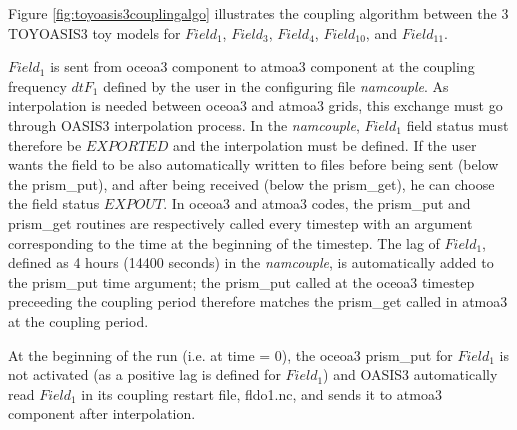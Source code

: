 Figure \ref{fig:toyoasis3couplingalgo} illustrates the coupling
algorithm between the 3 TOYOASIS3 toy models for $Field_1$, $Field_3$,
$Field_4$, $Field_{10}$, and $Field_{11}$.

$Field_1$ is sent from oceoa3 component to atmoa3 component at the
coupling frequency $dtF_1$ defined by the user in the configuring file
{\it namcouple}. As interpolation is
needed between oceoa3 and atmoa3 grids, this exchange must go through
OASIS3 interpolation process. In the {\it namcouple}, $Field_1$ field status
must therefore be $EXPORTED$ and the interpolation must be defined. If
the user wants the field to be also automatically written to files
before being sent (below the prism\_put), and after being received (below
the prism\_get), he can choose the field status $EXPOUT$. In oceoa3 and atmoa3
codes, the prism\_put and prism\_get routines are respectively called
every timestep with an argument corresponding to the time at the
beginning of the timestep. The lag of $Field_1$, defined as 4 hours
(14400 seconds) in the {\it namcouple}, is automatically added to the
prism\_put time argument; the prism\_put called at the oceoa3 timestep
preceeding the coupling period therefore matches the prism\_get called
in atmoa3 at the coupling period.

At the beginning of the run (i.e. at time = 0), the oceoa3 prism\_put for
$Field_1$ is not activated (as a positive lag is defined for
$Field_1$) and OASIS3 automatically read $Field_1$ in its coupling
restart file, fldo1.nc, and sends it to atmoa3 component after
interpolation. 




